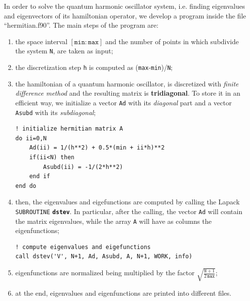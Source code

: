 \documentclass[rmp,10pt,onecolumn,fleqn,notitlepage]{revtex4-1}
\begin{document}
In order to solve the quantum harmonic oscillator system, i.e. finding eigenvalues and eigenvectors of its hamiltonian operator, we develop a program inside the file “hermitian.f90”. The main steps of the program are:
\begin{enumerate}
\item the space interval $[\texttt{min}:\texttt{max}]$ and the number of points in which subdivide the system \texttt{N}, are taken as input;

\item the discretization step \texttt{h} is computed as (\texttt{max}-\texttt{min})/\texttt{N};

\item the hamiltonian of a quantum harmonic oscillator, is discretized with \emph{finite difference method} and the resulting matrix is \textbf{tridiagonal}. To store it in an efficient way, we initialize a vector \texttt{Ad} with its \emph{diagonal} part and a vector \texttt{Asubd} with its \emph{subdiagonal};

\begin{minipage}[t]{0.4\linewidth}%
\begin{lstlisting}[style=Fortran]
! initialize hermitian matrix A
do ii=0,N
    Ad(ii) = 1/(h**2) + 0.5*(min + ii*h)**2
    if(ii<N) then
        Asubd(ii) = -1/(2*h**2)
    end if
end do\end{lstlisting}
\end{minipage}

\item then, the eigenvalues and eigefunctions are computed by calling the Lapack \texttt{SUBROUTINE} {\bfseries\texttt{dstev}}. In particular, after the calling, the vector \texttt{Ad} will contain the matrix eigenvalues, while the array \texttt{A} will have as columns the eigenfunctions;

\begin{minipage}[t]{0.55\linewidth}%
\begin{lstlisting}[style=Fortran]
! compute eigenvalues and eigefunctions
call dstev('V', N+1, Ad, Asubd, A, N+1, WORK, info)\end{lstlisting}
\end{minipage}

\item eigenfunctions are normalized being multiplied by the factor \( \sqrt{\frac{\texttt{N}+1}{2\, \texttt{max}}}  \);

\item at the end, eigenvalues and eigenfunctions are printed into different files.
\end{enumerate}
\end{document}
